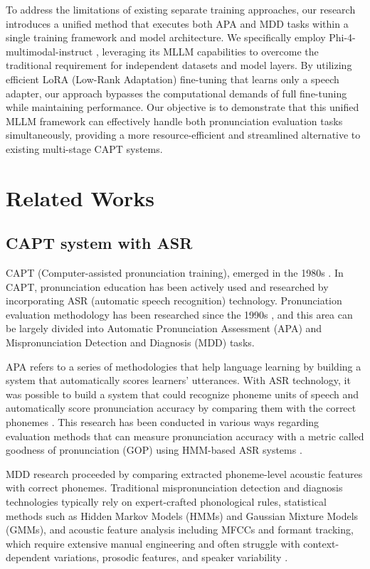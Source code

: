 \documentclass[sigconf,nonacm]{acmart}
\begin{document}
To address the limitations of existing separate training approaches, our research introduces a unified method that executes both APA and MDD tasks within a single training framework and model architecture. We specifically employ Phi-4-multimodal-instruct \cite{abouelenin2025phi}, leveraging its MLLM capabilities to overcome the traditional requirement for independent datasets and model layers. 
By utilizing efficient LoRA (Low-Rank Adaptation) fine-tuning that learns only a speech adapter, our approach bypasses the computational demands of full fine-tuning while maintaining performance. Our objective is to demonstrate that this unified MLLM framework can effectively handle both pronunciation evaluation tasks simultaneously, providing a more resource-efficient and streamlined alternative to existing multi-stage CAPT systems.

\section{Related Works}
\subsection{CAPT system with ASR}
CAPT (Computer-assisted pronunciation training), emerged in the 1980s \cite{fouz2015trends}. In CAPT, pronunciation education has been actively used and researched by incorporating ASR (automatic speech recognition) technology. Pronunciation evaluation methodology has been researched since the 1990s \cite{hong2021automated} \cite{bernstein1990automatic} \cite{franco2000combination}, and this area can be largely divided into Automatic Pronunciation Assessment (APA) and Mispronunciation Detection and Diagnosis (MDD) tasks.

APA refers to a series of methodologies that help language learning by building a system that automatically scores learners' utterances. With ASR technology, it was possible to build a system that could recognize phoneme units of speech and automatically score pronunciation accuracy by comparing them with the correct phonemes \cite{franco2000sri} \cite{franco2000combination}. This research has been conducted in various ways regarding evaluation methods that can measure pronunciation accuracy with a metric called goodness of pronunciation (GOP) using HMM-based ASR systems \cite{hong2021automated} \cite{witt2000phone}.

MDD research proceeded by comparing extracted phoneme-level acoustic features with correct phonemes. Traditional mispronunciation detection and diagnosis technologies typically rely on expert-crafted phonological rules, statistical methods such as Hidden Markov Models (HMMs) and Gaussian Mixture Models (GMMs), and acoustic feature analysis including MFCCs and formant tracking, which require extensive manual engineering and often struggle with context-dependent variations, prosodic features, and speaker variability  \cite{witt2000phone}  \cite{eskenazi2009overview}  \cite{qian2010use}.
\end{document}

